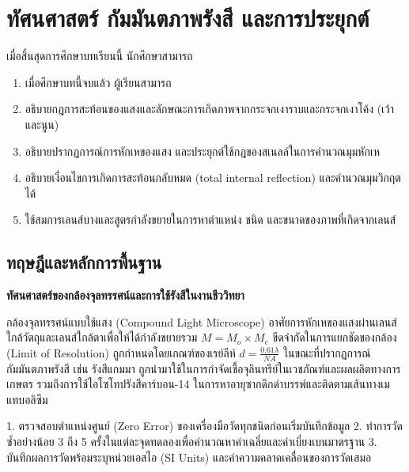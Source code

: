 \chapter{ทัศนศาสตร์ กัมมันตภาพรังสี และการประยุกต์}
\label{ch:ch13_optics_radioactivity}

\begin{conceptbox}[title=วัตถุประสงค์การเรียนรู้ประจำบท]
เมื่อสิ้นสุดการศึกษาบทเรียนนี้ นักศึกษาสามารถ
\begin{enumerate}
    \item เมื่อศึกษาบทนี้จบแล้ว ผู้เรียนสามารถ
    \item อธิบายกฎการสะท้อนของแสงและลักษณะการเกิดภาพจากกระจกเงาราบและกระจกเงาโค้ง (เว้าและนูน)
    \item อธิบายปรากฏการณ์การหักเหของแสง และประยุกต์ใช้กฎของสเนลล์ในการคำนวณมุมหักเห
    \item อธิบายเงื่อนไขการเกิดการสะท้อนกลับหมด (total internal reflection) และคำนวณมุมวิกฤตได้
    \item ใช้สมการเลนส์บางและสูตรกำลังขยายในการหาตำแหน่ง ชนิด และขนาดของภาพที่เกิดจากเลนส์
\end{enumerate}
\end{conceptbox}

\section{ทฤษฎีและหลักการพื้นฐาน}

\begin{bioappbox}
\textbf{ทัศนศาสตร์ของกล้องจุลทรรศน์และการใช้รังสีในงานชีววิทยา}

กล้องจุลทรรศน์แบบใช้แสง (Compound Light Microscope) อาศัยการหักเหของแสงผ่านเลนส์ใกล้วัตถุและเลนส์ใกล้ตาเพื่อให้ได้กำลังขยายรวม $M = M_o \times M_e$ ขีดจำกัดในการแยกชัดของกล้อง (Limit of Resolution) ถูกกำหนดโดยเกณฑ์ของเรย์ลีห์ $d = \frac{0.61\lambda}{NA}$ ในขณะที่ปรากฏการณ์กัมมันตภาพรังสี เช่น รังสีแกมมา ถูกนำมาใช้ในการกำจัดเชื้อจุลินทรีย์ในเวชภัณฑ์และผลผลิตทางการเกษตร รวมถึงการใช้ไอโซโทปรังสีคาร์บอน-14 ในการหาอายุซากดึกดำบรรพ์และติดตามเส้นทางเมแทบอลิซึม
\end{bioappbox}

\begin{labbox}
1. ตรวจสอบตำแหน่งศูนย์ (Zero Error) ของเครื่องมือวัดทุกชนิดก่อนเริ่มบันทึกข้อมูล
2. ทำการวัดซ้ำอย่างน้อย 3 ถึง 5 ครั้งในแต่ละจุดทดลองเพื่อคำนวณหาค่าเฉลี่ยและค่าเบี่ยงเบนมาตรฐาน
3. บันทึกผลการวัดพร้อมระบุหน่วยเอสไอ (SI Units) และค่าความคลาดเคลื่อนของการวัดเสมอ
\end{labbox}

